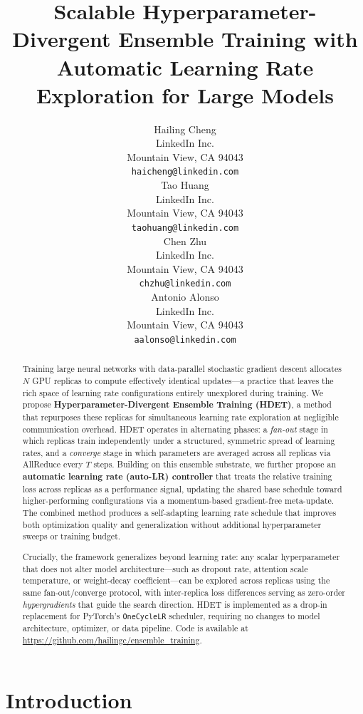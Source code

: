 \documentclass{article}
\title{Scalable Hyperparameter-Divergent Ensemble Training with Automatic Learning Rate Exploration for Large Models}
\author{%
  Hailing Cheng \\
  LinkedIn Inc.\\
  Mountain View, CA 94043 \\
  \texttt{haicheng@linkedin.com} \\
  \And
  Tao Huang \\
  LinkedIn Inc.\\
  Mountain View, CA 94043 \\
  \texttt{taohuang@linkedin.com} \\
  \And
  Chen Zhu \\
  LinkedIn Inc.\\
  Mountain View, CA 94043 \\
  \texttt{chzhu@linkedin.com} \\
  \And
  Antonio Alonso \\
  LinkedIn Inc.\\
  Mountain View, CA 94043 \\
  \texttt{aalonso@linkedin.com} \\
}
\begin{document}
\maketitle

\begin{abstract}
Training large neural networks with data-parallel stochastic gradient descent
allocates $N$ GPU replicas to compute effectively identical updates---a practice that
leaves the rich space of learning rate configurations entirely unexplored during training.
We propose \textbf{Hyperparameter-Divergent Ensemble Training (HDET)}, a method that
repurposes these replicas for simultaneous learning rate exploration at negligible
communication overhead.
HDET operates in alternating phases: a \emph{fan-out} stage in which replicas train
independently under a structured, symmetric spread of learning rates, and a
\emph{converge} stage in which parameters are averaged across all replicas via
AllReduce every $T$ steps.
Building on this ensemble substrate, we further propose an
\textbf{automatic learning rate (auto-LR) controller} that treats the relative
training loss across replicas as a performance signal, updating the shared base
schedule toward higher-performing configurations via a momentum-based
gradient-free meta-update.
The combined method produces a self-adapting learning rate schedule that improves
both optimization quality and generalization without additional hyperparameter sweeps
or training budget.

Crucially, the framework generalizes beyond learning rate: any scalar hyperparameter
that does not alter model architecture---such as dropout rate, attention scale
temperature, or weight-decay coefficient---can be explored across replicas using the
same fan-out/converge protocol, with inter-replica loss differences serving as
zero-order \emph{hypergradients} that guide the search direction.
HDET is implemented as a drop-in replacement for PyTorch's \texttt{OneCycleLR}
scheduler, requiring no changes to model architecture, optimizer, or data pipeline.
Code is available at \url{https://github.com/hailingc/ensemble_training}.
\end{abstract}

\section{Introduction}
\label{sec:intro}
\end{document}
